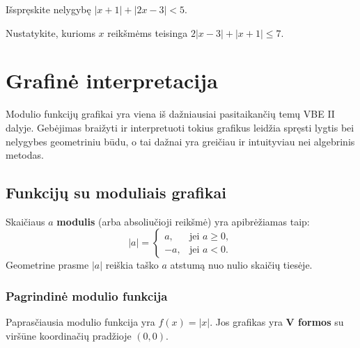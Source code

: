 \begin{exercise}
Išspręskite nelygybę $|x + 1| + |2x - 3| < 5$.
\end{exercise}

\begin{exercise}
Nustatykite, kurioms $x$ reikšmėms teisinga $2|x - 3| + |x + 1| \leq 7$.
\end{exercise}

\section{Grafinė interpretacija}

Modulio funkcijų grafikai yra viena iš dažniausiai pasitaikančių temų VBE II dalyje. Gebėjimas braižyti ir interpretuoti tokius grafikus leidžia spręsti lygtis bei nelygybes geometriniu būdu, o tai dažnai yra greičiau ir intuityviau nei algebrinis metodas.

\subsection{Funkcijų su moduliais grafikai}

\begin{definition}
Skaičiaus $a$ \textbf{modulis} (arba absoliučioji reikšmė) yra apibrėžiamas taip:
\[
|a| = \begin{cases} a, & \text{jei } a \geq 0, \\ -a, & \text{jei } a < 0. \end{cases}
\]
Geometrine prasme $|a|$ reiškia taško $a$ atstumą nuo nulio skaičių tiesėje.
\end{definition}

\subsubsection*{Pagrindinė modulio funkcija}

Paprasčiausia modulio funkcija yra $f(x) = |x|$. Jos grafikas yra \textbf{V formos} su viršūne koordinačių pradžioje $(0,0)$.

\begin{center}
\end{center}

